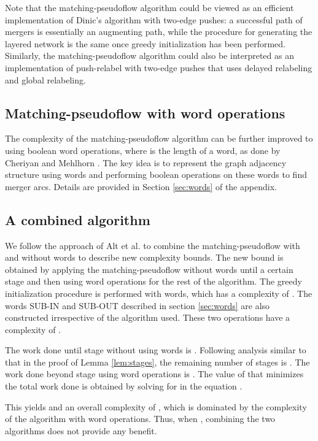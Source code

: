 \documentclass{article}
\begin{document}
Note that the {\sf matching-pseudoflow} algorithm could be viewed as an efficient implementation of Dinic's algorithm with two-edge pushes: a successful path of mergers is essentially an augmenting path, while the procedure for generating the layered network is the same once greedy initialization has been performed.  Similarly, the {\sf matching-pseudoflow} algorithm could also be interpreted as an implementation of push-relabel with two-edge pushes that uses delayed relabeling and global relabeling.

\subsection{Matching-pseudoflow with word operations}

The complexity of the matching-pseudoflow algorithm can be further
improved to  using boolean word
operations, where  is the length of a word, as done by Cheriyan and Mehlhorn \cite{CheM96}.  The key
idea is to represent the graph adjacency structure using words and
performing boolean operations on these words to find merger arcs.
Details are provided in Section \ref{sec:words} of the appendix.

\subsection{A combined algorithm}
\label{sec:combined}

We follow the approach of Alt et al. \cite{AltBMP91} to combine the
{\sf matching-pseudoflow} with and without words to describe new
complexity bounds.  The new bound is obtained by applying the {\sf
matching-pseudoflow} without words until a certain  stage  and
then using word operations for the rest of the algorithm. The greedy
initialization procedure is performed with words, which has a
complexity of \mbox{}.
The words SUB-IN and SUB-OUT described in section \ref{sec:words} are
also constructed irrespective of the algorithm used. These two
operations have a complexity of
\mbox{}.
\smallskip

 \smallskip

The work done until stage  without using words is . Following analysis similar to that in the proof of Lemma \ref{lem:stages}, the remaining number of stages is .  The work done beyond stage  using word operations is .  The value of  that minimizes the total work done is obtained by solving for  in the equation .

This yields  and an overall complexity of \mbox{}, which is dominated by the complexity of the algorithm with word operations. Thus, when , combining the two algorithms does not provide any benefit. \smallskip
\end{document}
